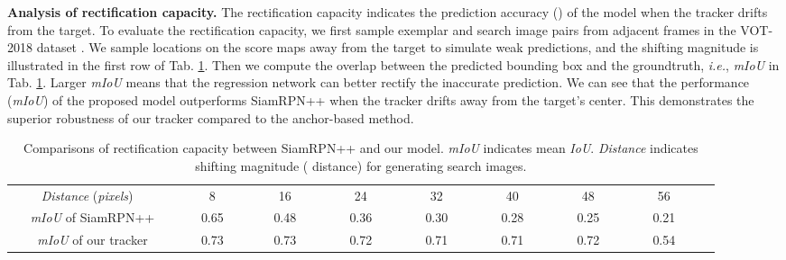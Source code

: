 \documentclass[runningheads]{llncs}
\begin{document}
\noindent\textbf{Analysis of rectification capacity.} The rectification capacity indicates the prediction accuracy () of the model when the tracker drifts from the target.  To evaluate the rectification capacity, we first sample exemplar and search image pairs from adjacent frames in the VOT-2018 dataset \cite{VOT-2018}.  We sample locations on the score maps away from the target to simulate weak predictions, and the shifting magnitude is illustrated in the first row of Tab. \ref{RETTAB}. Then we compute the overlap between the predicted bounding box and the groundtruth,  \emph{i.e.}, \emph{mIoU} in Tab. \ref{RETTAB}. Larger \emph{mIoU} means that the regression network can better rectify the inaccurate prediction. We can see that the performance (\emph{mIoU}) of the proposed model outperforms SiamRPN++ \cite{SiamRPN++} when the tracker drifts away from the target's center.  This demonstrates the superior robustness of our tracker compared to the anchor-based method.

\begin{table}\footnotesize
	\begin{center}
		
		\vspace{-1em}
		\fontsize{8pt}{4mm}
		\begin{threeparttable}
			\begin{tabular}{ @{}c@{} | @{}c@{} @{}c@{} @{}c@{}  @{}c@{} @{}c@{} @{}c@{} @{}c@{} @{}c@{}}
\emph{Distance} (\emph{pixels}) ~  & ~~~~8~~~~ & ~~~~16~~~~ & ~~~~24~~~~ & ~~~~32~~~~ & ~~~~40~~~~ & ~~~~48~~~~ & ~~~~56~~~~
				\\
				\cline{1-9} 
				~~ \emph {mIoU} of SiamRPN++ \cite{SiamRPN++}~~& 0.65 & 0.48 & 0.36 & 0.30 & 0.28 & 0.25 & 0.21 & 
				\\
				~~ \emph{mIoU} of our tracker ~~& 0.73 & 0.73 & 0.72 & 0.71 & 0.71 & 0.72 & 0.54
				
				
			\end{tabular}
			
		\end{threeparttable}
		\vspace{0.3em}
		\caption{Comparisons of rectification capacity between SiamRPN++ and our model. \emph{mIoU} indicates mean \emph{IoU}. \emph{Distance} indicates shifting magnitude ( distance) for generating search images.}
		
		
		\vspace{-3em}
		\label{RETTAB}
	\end{center}
\end{table}
\end{document}
